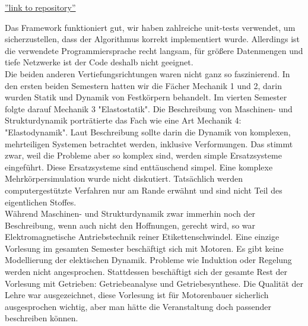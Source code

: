 \documentclass[12pt]{article}
\begin{document}
\begin{large}
\href{https://bitbucket.org/lhk/cv}{''link to repository''} 

Das Framework funktioniert gut, wir haben zahlreiche unit-tests verwendet, um sicherzustellen, dass der Algorithmus korrekt implementiert wurde.
Allerdings ist die verwendete Programmiersprache recht langsam, für größere Datenmengen und tiefe Netzwerke ist der Code deshalb nicht geeignet.\\

Die beiden anderen Vertiefungsrichtungen waren nicht ganz so faszinierend.
In den ersten beiden Semestern hatten wir die Fächer Mechanik 1 und 2, darin wurden Statik und Dynamik von Festkörpern behandelt. Im vierten Semester folgte darauf Mechanik 3 "Elastostatik". Die Beschreibung von Maschinen- und Strukturdynamik porträtierte das Fach wie eine Art Mechanik 4: "Elastodynamik". Laut Beschreibung sollte darin die Dynamik von komplexen, mehrteiligen Systemen betrachtet werden, inklusive Verformungen.
Das stimmt zwar, weil die Probleme aber so komplex sind, werden simple Ersatzsysteme eingeführt. Diese Ersatzsysteme sind enttäuschend simpel. Eine komplexe Mehrkörpersimulation wurde nicht diskutiert. Tatsächlich werden computergestützte Verfahren nur am Rande erwähnt und sind nicht Teil des eigentlichen Stoffes.\\
Während Maschinen- und Strukturdynamik zwar immerhin noch der Beschreibung, wenn auch nicht den Hoffnungen, gerecht wird, so war Elektromagnetische Antriebstechnik reiner Etikettenschwindel. Eine einzige Vorlesung im gesamten Semester beschäftigt sich mit Motoren. Es gibt keine Modellierung der elektischen Dynamik. Probleme wie Induktion oder Regelung werden nicht angesprochen. Stattdessen beschäftigt sich der gesamte Rest der Vorlesung mit Getrieben: Getriebeanalyse und Getriebesynthese. Die Qualität der Lehre war ausgezeichnet, diese Vorlesung ist für Motorenbauer sicherlich ausgesprochen wichtig, aber man hätte die Veranstaltung doch passender beschreiben können.


\end{large}
\end{document}
